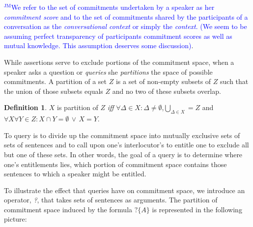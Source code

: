 \documentclass{article}                     %
\makeatletter
\theoremstyle{definition}
\newtheorem{definition}{Definition}[section]
\newcommand{\raisemath}[1]{\mathpalette{\raisem@th{#1}}}
\newcommand{\raisem@th}[3]{\raisebox{#1}{$#2#3$}}
\newcommand{\nmc}{%
	\mathbin{\mathpalette\nm@\expandafter}
}
\newcommand{\nm@}{\mid\joinrel\mkern-.5mu\sim\mkern-3mu}
\newcommand{\bigperpp}{%
	\mathop{\mathpalette\bigp@rpp\relax}%
	\displaylimits
}
\newcommand{\bigp@rpp}[2]{%
	\vcenter{
		\m@th\hbox{\scalebox{\ifx#1\displaystyle1.15\else1.15\fi}{$#1\perp$}}
	}%
}
\newcommand{\bigperp}{\raisemath{.5pt}{\bigperpp}}
\newcommand{\jm}[1]{\textcolor{blue}{$^{\textrm{JM}}${#1}}}
\makeatother
\begin{document}
\jm{We refer to the set of commitments undertaken by a speaker as her \textit{commitment score} and to the set of commitments shared by the participants of a conversation as the \textit{conversational context} or simply the \textit{context}. (We seem to be assuming perfect transparency of participants commitment scores as well as mutual knowledge. This assumption deserves some discussion)}.



While assertions serve to exclude portions of the commitment space, when a speaker asks a question or \textit{queries} she \textit{partitions} the space of possible commitments. A partition of a set $ Z $ is a set of non-empty subsets of $ Z $ such that the union of those subsets equals $ Z $ and no two of these subsets overlap.

\begin{definition}
\item $ X $ is partition of $ Z $ \textit{iff} $ \forall\Delta \in X: \Delta \neq \emptyset$,$ \bigcup\limits_{\Delta \in X}=  Z$ and $ \forall X \forall Y \in Z: X \cap Y = \emptyset \,\vee\, X = Y $.
\end{definition}

To query is to divide up the commitment space into mutually exclusive sets of sets of sentences and to call upon one's interlocutor's to entitle one to exclude all but one of these sets. In other words, the goal of a query is to determine where one's entitlements lies, which portion of commitment space contains those sentences to which a speaker might be entitled. 

To illustrate the effect that queries have on commitment space, we introduce an operator, \textit{?}, that takes sets of sentences as arguments. The partition of commitment space induced by the formula $ ?\{A\} $ is represented in the following picture:

\begin{center}
	


\end{center}
\end{document}
